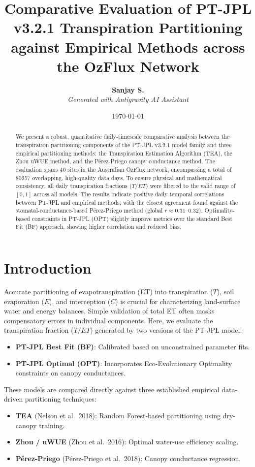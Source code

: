 \documentclass[11pt,a4paper]{article}
\title{\textbf{\Large Comparative Evaluation of PT-JPL v3.2.1 Transpiration Partitioning\\[4pt]
against Empirical Methods across the OzFlux Network}}
\author{\textbf{Sanjay S.} \\[4pt]
\textit{Generated with Antigravity AI Assistant}}
\date{\today}
\begin{document}
\maketitle

\begin{abstract}
We present a robust, quantitative daily-timescale comparative analysis between the transpiration partitioning components of the PT-JPL v3.2.1 model family and three empirical partitioning methods: the Transpiration Estimation Algorithm (TEA), the Zhou uWUE method, and the Pérez-Priego canopy conductance method. The evaluation spans 40 sites in the Australian OzFlux network, encompassing a total of 80257 overlapping, high-quality data days. To ensure physical and mathematical consistency, all daily transpiration fractions ($T/ET$) were filtered to the valid range of $[0, 1]$ across all models. The results indicate positive daily temporal correlations between PT-JPL and empirical methods, with the closest agreement found against the stomatal-conductance-based Pérez-Priego method (global $r \approx 0.31$--$0.32$). Optimality-based constraints in PT-JPL (OPT) slightly improve metrics over the standard Best Fit (BF) approach, showing higher correlation and reduced bias.
\end{abstract}

\section{Introduction}
Accurate partitioning of evapotranspiration (ET) into transpiration ($T$), soil evaporation ($E$), and interception ($C$) is crucial for characterizing land-surface water and energy balances. Simple validation of total ET often masks compensatory errors in individual components. Here, we evaluate the transpiration fraction ($T/ET$) generated by two versions of the PT-JPL model:
\begin{itemize}
  \item \textbf{PT-JPL Best Fit (BF)}: Calibrated based on unconstrained parameter fits.
  \item \textbf{PT-JPL Optimal (OPT)}: Incorporates Eco-Evolutionary Optimality constraints on canopy conductances.
\end{itemize}
These models are compared directly against three established empirical data-driven partitioning techniques:
\begin{itemize}
  \item \textbf{TEA} (Nelson et al.\ 2018): Random Forest-based partitioning using dry-canopy training.
  \item \textbf{Zhou / uWUE} (Zhou et al.\ 2016): Optimal water-use efficiency scaling.
  \item \textbf{Pérez-Priego} (Pérez-Priego et al.\ 2018): Canopy conductance regression.
\end{itemize}
\end{document}
